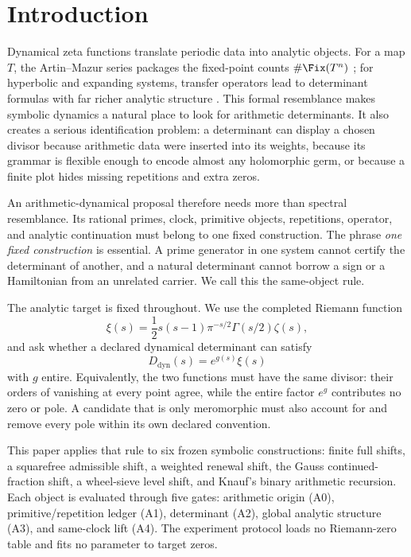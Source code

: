 \section{Introduction}
\label{sec:introduction}

Dynamical zeta functions translate periodic data into analytic objects.  For a
map \(T\), the Artin--Mazur series packages the fixed-point counts
\(\#\Fix(T^n)\) \citep{artin1965periodic}; for hyperbolic and expanding
systems, transfer operators lead to determinant formulas with far richer
analytic structure \citep{ruelle1976zeta}.  This formal resemblance makes
symbolic dynamics a natural place to look for arithmetic determinants.  It
also creates a serious identification problem: a determinant can display a
chosen divisor because arithmetic data were inserted into its weights, because
its grammar is flexible enough to encode almost any holomorphic germ, or
because a finite plot hides missing repetitions and extra zeros.

An arithmetic-dynamical proposal therefore needs more than spectral
resemblance.  Its rational primes, clock, primitive objects, repetitions,
operator, and analytic continuation must belong to one fixed construction.
The phrase \emph{one fixed construction} is essential.  A prime generator in
one system cannot certify the determinant of another, and a natural
determinant cannot borrow a sign or a Hamiltonian from an unrelated carrier.
We call this the same-object rule.

The analytic target is fixed throughout.  We use the completed Riemann
function
\[
  \xi(s)=\frac12s(s-1)\pi^{-s/2}\Gamma(s/2)\zeta(s),
\]
and ask whether a declared dynamical determinant can satisfy
\begin{equation}
  \label{eq:target-divisor}
  D_{\mathrm{dyn}}(s)=e^{g(s)}\xi(s)
\end{equation}
with $g$ entire.  Equivalently, the two functions must have the same divisor:
their orders of vanishing at every point agree, while the entire factor
$e^g$ contributes no zero or pole.  A candidate that is only meromorphic must
also account for and remove every pole within its own declared convention.

This paper applies that rule to six frozen symbolic constructions:
finite full shifts, a squarefree admissible shift, a weighted renewal shift,
the Gauss continued-fraction shift, a wheel-sieve level shift, and Knauf's
binary arithmetic recursion.  Each object is evaluated through five gates:
arithmetic origin (A0), primitive/repetition ledger (A1), determinant (A2),
global analytic structure (A3), and same-clock lift (A4).  The experiment
protocol loads no Riemann-zero table and fits no parameter to target zeros.

